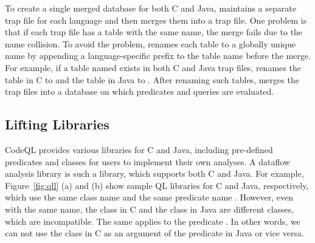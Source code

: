 To create a single merged database for both C and Java, \ours maintains a
separate trap file for each language and then merges them into a trap file.
One problem is that if each trap file has a table with the same name, the merge
fails due to the name collision.  To avoid the problem, \ours renames each
table to a globally unique name by appending a language-specific prefix to the
table name before the merge.  For example, if a table named 
exists in both C and Java trap files, \ours renames the table in C to
 and the table in Java to .  After
renaming such tables, \ours merges the trap files into a database on which
predicates and queries are evaluated.


\subsection{Lifting Libraries}

CodeQL provides various libraries for C and Java, including pre-defined
predicates and classes for users to implement their own analyses.  A dataflow
analysis library is such a library, which supports both C and Java.  For
example, Figure~\ref{fig:qll} (a) and (b) show sample QL libraries for C and
Java, respectively, which use the same class name  and the same
predicate name .  However, even with the same name, the
class  in C and the class  in Java are different
classes, which are incompatible.  The same applies to the predicate
.  In other words, we can not use the class 
in C as an argument of the predicate  in Java or vice
versa.


